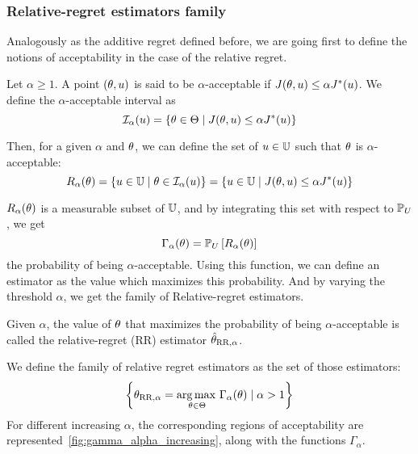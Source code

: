 \documentclass[../../Main_ManuscritThese.tex]{subfiles}
\begin{document}
\subsubsection{Relative-regret estimators family}
Analogously as the additive regret defined before, we are going first to define the notions of acceptability in the case of the relative regret.
\begin{definition}
  Let $\alpha\geq 1$.
  A point $(\theta, u)$ is said to be $\alpha$-acceptable if $J(\theta, u) \leq \alpha J^*(u)$.
  We define the $\alpha$-acceptable interval as
  \begin{equation}
    \mathcal{I}_{\alpha}(u) = \left\{\theta \in \Theta \mid J(\theta,u) \leq \alpha J^*(u) \right\}
  \end{equation}

Then, for a given $\alpha$ and $\theta$, we can define the set of $u\in \mathbb{U}$ such that $\theta$ is $\alpha$-acceptable:
\begin{equation}
  R_{\alpha}(\theta) = \left\{u \in \mathbb{U} \mid \theta \in \mathcal{I}_{\alpha}(u) \right\} = \left\{u \in \mathbb{U} \mid  J(\theta, u) \leq \alpha J^*(u) \right\}
\end{equation}
\end{definition}
$R_{\alpha}(\theta)$ is a measurable subset of $\mathbb{U}$, and by integrating this set with respect to $\mathbb{P}_U$, we get
\begin{equation}
\Gamma_{\alpha}(\theta) = \mathbb{P}_{U}\left[R_\alpha(\theta)\right]
\end{equation}
the probability of being $\alpha$-acceptable. Using this function, we can define an estimator as the value which maximizes this probability. And by varying the threshold $\alpha$, we get the family of Relative-regret estimators.


\begin{definition}
  Given $\alpha$, the value of $\theta$ that maximizes the probability of being $\alpha$-acceptable is called the relative-regret (RR) estimator $\hat{\theta}_{\mathrm{RR},\alpha}$.
  
We define the family of relative regret estimators as the set of those estimators:
\begin{equation}
      \left\{{\theta}_{\mathrm{RR,\alpha}} = \operatorname*{arg\,max \,}_{\theta\in\Theta} \Gamma_{\alpha}(\theta)\mid \alpha > 1\right\}
    \end{equation}
    For different increasing $\alpha$, the corresponding regions of acceptability are represented~\cref{fig:gamma_alpha_increasing}, along with the functions $\Gamma_{\alpha}$.
  \end{definition}
\end{document}
